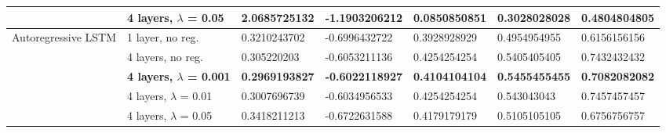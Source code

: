 \documentclass[pdftex,10pt,a4paper,journal]{article}
\theoremstyle{definition}
\theoremstyle{remark}
\begin{document}
{\begin{landscape}
\begin{tabular}{|l|l|l|l|l|l|l|}
                                      & 4 layers, $\lambda$ = 0.05           & 2.0685725132          & -1.1903206212          & 0.0850850851          & 0.3028028028          & 0.4804804805          \\ \hline
\multirow{5}{*}{Autoregressive LSTM}  & 1 layer, no reg.                     & 0.3210243702          & -0.6996432722          & 0.3928928929          & 0.4954954955          & 0.6156156156          \\ \cline{2-7} 
                                      & 4 layers, no reg.                    & 0.305220203           & -0.6053211136          & 0.4254254254          & 0.5405405405          & 0.7432432432          \\ \cline{2-7} 
                                      & \textbf{4 layers, $\lambda$ = 0.001} & \textbf{0.2969193827} & \textbf{-0.6022118927} & \textbf{0.4104104104} & \textbf{0.5455455455} & \textbf{0.7082082082} \\ \cline{2-7} 
                                      & 4 layers, $\lambda$ = 0.01           & 0.3007696739          & -0.6034956533          & 0.4254254254          & 0.543043043           & 0.7457457457          \\ \cline{2-7} 
                                      & 4 layers, $\lambda$ = 0.05           & 0.3418211213          & -0.6722631588          & 0.4179179179          & 0.5105105105          & 0.6756756757          \\ \hline
\end{tabular}
\label{tab:sunspot}

\end{landscape}
\clearpage%
}
\end{document}

